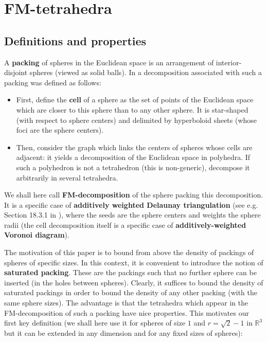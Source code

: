 \documentclass[11pt]{article}
\begin{document}
\section{FM-tetrahedra}
\label{sec:settings}

\subsection{Definitions and properties}

A {\bf packing} of spheres in the Euclidean space is an arrangement of interior-disjoint spheres (viewed as solid balls).
In \cite{FM58} a decomposition associated with such a packing was defined as follows:
\begin{itemize}
\item
First, define the {\bf cell} of a sphere as the set of points of the Euclidean space which are closer to this sphere than to any other sphere.
It is star-shaped (with respect to sphere centers) and delimited by hyperboloid sheets (whose foci are the sphere centers).
\item
Then, consider the graph which links the centers of spheres whose cells are adjacent: it yields a decomposition of the Euclidean space in polyhedra.
If such a polyhedron is not a tetrahedron (this is non-generic), decompose it arbitrarily in several tetrahedra.
\end{itemize}
We shall here call {\bf FM-decomposition} of the sphere packing this decomposition.
It is a specific case of {\bf additively weighted Delaunay triangulation} (see e.g. Section 18.3.1 in \cite{BY98}), where the seeds are the sphere centers and weights the sphere radii (the cell decomposition itself is a specific case of {\bf additively-weighted Voronoi diagram}).

The motivation of this paper is to bound from above the density of packings of spheres of specific sizes.
In this context, it is convenient to introduce the notion of {\bf saturated packing}.
These are the packings such that no further sphere can be inserted (in the holes between spheres).
Clearly, it suffices to bound the density of saturated packings in order to bound the density of any other packing (with the same sphere sizes).
The advantage is that the tetrahedra which appear in the FM-decomposition of such a packing have nice properties.
This motivates our first key definition (we shall here use it for spheres of size $1$ and $r=\sqrt{2}-1$ in $\mathbb{R}^3$ but it can be extended in any dimension and for any fixed sizes of spheres):
\end{document}
